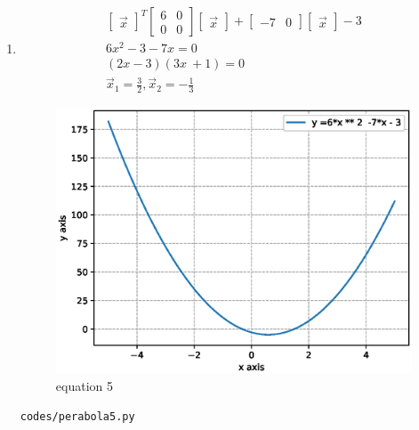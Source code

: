 \begin{enumerate}[label=\arabic*.,ref=\thesubsection.\theenumi]
\item
\begin{align}
\begin{bmatrix}\vec x\end{bmatrix}^T\begin{bmatrix}6 & 0\\0 & 0\end{bmatrix}\begin{bmatrix}\vec x\end{bmatrix} + \begin{bmatrix}-7 & 0\end{bmatrix}\begin{bmatrix}\vec x\end{bmatrix} -3
\\
6x^2-3-7x = 0
\\
\left(2x - 3\right)\left(3x\ + 1\right) = 0
\\
\vec x_1 = \frac{3}{2},\vec x_2 =-\frac{1}{3}
\end{align}
\begin{figure}[!ht]
	\centering
	\includegraphics[width=\columnwidth]{./figures/perabola5.eps}
	\caption{equation 5 }
	\label{fig:perabola5}
\end{figure}
\begin{lstlisting}
codes/perabola5.py
\end{lstlisting}



\end{enumerate}
